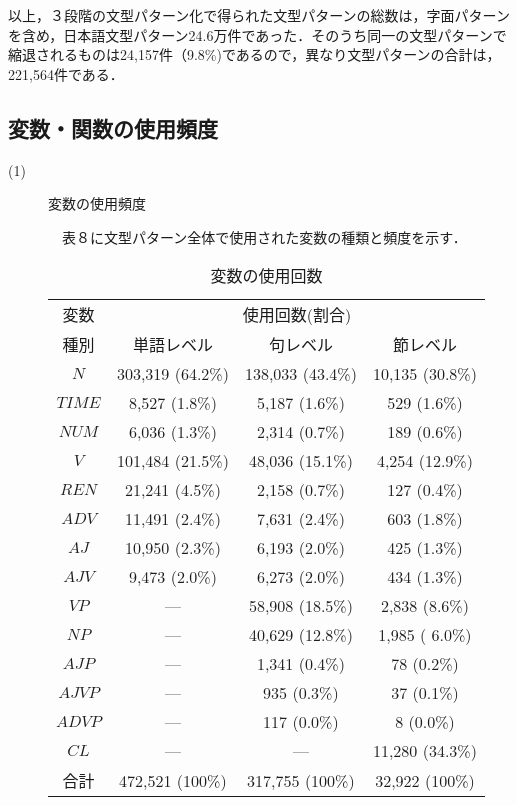\documentclass{nlp}
\begin{document}
以上，３段階の文型パターン化で得られた文型パターンの総数は，字面パターンを含め，日本語文型パターン24.6万件であった．そのうち同一の文型パターンで縮退されるものは24,157件（9.8\%)であるので，異なり文型パターンの合計は，221,564件である．

\subsection{変数・関数の使用頻度}
\begin{description}
\item[(1)]変数の使用頻度

　表８に文型パターン全体で使用された変数の種類と頻度を示す．

\begin{table}[!htbp]
\footnotesize
\begin{center}
\caption{変数の使用回数}
\begin{tabular}{|c|c|c|c|}
\hline
変数 & \multicolumn{3}{|c|}{使用回数(割合)} \\ \cline{2-4}
種別 & 単語レベル & 句レベル & 節レベル \\ \hline
$N$ & 303,319 (64.2\%) & 138,033 (43.4\%) & 10,135 (30.8\%) \\ \hline
$TIME$ & 8,527 (1.8\%) & 5,187 (1.6\%) & 529 (1.6\%) \\ \hline
$NUM$ & 6,036 (1.3\%) & 2,314 (0.7\%) & 189 (0.6\%) \\ \hline
$V$ & 101,484 (21.5\%) & 48,036 (15.1\%) & 4,254 (12.9\%) \\ \hline
$REN$ & 21,241 (4.5\%) & 2,158 (0.7\%) & 127 (0.4\%)  \\ \hline
$ADV$ & 11,491 (2.4\%) & 7,631 (2.4\%) & 603 (1.8\%) \\ \hline
$AJ$ & 10,950 (2.3\%) & 6,193 (2.0\%) & 425 (1.3\%) \\ \hline
$AJV$ & 9,473 (2.0\%)  & 6,273 (2.0\%) & 434 (1.3\%) \\ \hline
$VP$ & ---  & 58,908 (18.5\%) & 2,838 (8.6\%) \\ \hline
$NP$ & ---  & 40,629 (12.8\%) & 1,985 ( 6.0\%) \\ \hline
$AJP$ & --- & 1,341 (0.4\%) & 78 (0.2\%) \\ \hline
$AJVP$ & --- & 935 (0.3\%) & 37 (0.1\%) \\ \hline
$ADVP$ & --- & 117 (0.0\%) & 8 (0.0\%) \\ \hline
$CL$ & --- & --- & 11,280 (34.3\%) \\ \hline
合計 & 472,521 (100\%) & 317,755 (100\%) & 32,922 (100\%) \\ \hline
\end{tabular}
\end{center}
\end{table}


\end{description}
\end{document}
